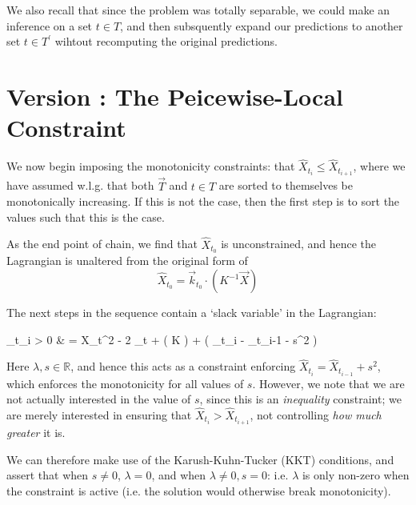 \documentclass{article}
\def\llangle{\left\langle}
\def\rrangle{\right\rangle}
\newcommand\E[1]{\llangle #1 \rrangle}
\newcounter{version}
\newcommand\attempt[1]{\stepcounter{version} \section*{Version \theversion: #1}}
\begin{document}
		We also recall that since the problem was totally separable, we could make an inference on a set $t \in T$, and then subsquently expand our predictions to another set $t \in T^\prime$ wihtout recomputing the original predictions. 

	\attempt{The Peicewise-Local Constraint}

		We now begin imposing the monotonicity constraints: that $\hat{X}_{t_i} \leq \hat{X}_{t_{i+1}}$, where we have assumed w.l.g. that both $\vec{T}$ and $t \in T$ are sorted to themselves be monotonically increasing. If this is not the case, then the first step is to sort the values such that this is the case. 
		
		As the end point of chain, we find that $\hat{X}_{t_0}$ is unconstrained, and hence the Lagrangian is unaltered from the original form of 
		\begin{equation}
			\hat{X}_{t_0} = \vec{k}_{t_0} \cdot \left( K^{-1} \vec{X} \right)
		\end{equation}

		The next steps in the sequence contain a `slack variable' in the Lagrangian:
		\begin{spalign}
			_{t_{i > 0}} & = \E{X_t^2} - 2 _t \cdot \a + \a \cdot \left( K \a\right) + \lambda \left( \hat{X}_{t_i} - _{t_{i-1}} - s^2 \right)
		\end{spalign}
		Here $\lambda, s \in \mathbb{R}$, and hence this acts as a constraint enforcing $\hat{X}_{t_i} = \hat{X}_{t_{i-1}} + s^2$, which enforces the monotonicity for all values of $s$. However, we note that we are not actually interested in the value of $s$, since this is an \textit{inequality} constraint; we are merely interested in ensuring that $\hat{X}_{t_i} > \hat{X}_{t_{i+1}}$, not controlling \textit{how much greater} it is. 

		We can therefore make use of the Karush-Kuhn-Tucker (KKT) conditions, and assert that when $s \neq 0$, $\lambda = 0$, and when $\lambda \neq 0, s = 0$: i.e. $\lambda$ is only non-zero when the constraint is active (i.e. the solution would otherwise break monotonicity).
\end{document}
